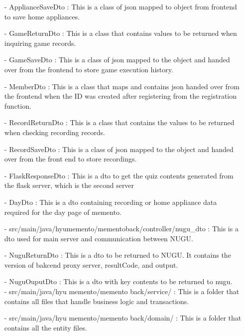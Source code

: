 \documentclass[conference]{IEEEtran}
\begin{document}
\begin{enumerate}
        \item[-] ApplianceSaveDto : This is a class of json mapped to object from frontend to save home appliances.\\
        \item [-] GameReturnDto : This is a class that contains values to be returned when inquiring game records.\\
        \item [-] GameSaveDto : This is a class of json mapped to the object and handed over from the frontend to store game execution history.\\
        \item [-] MemberDto : This is a class that maps and contains json handed over from the frontend when the ID was created after registering from the registration function.\\
        \item [-] RecordReturnDto : This is a class that contains the values to be returned when checking recording records.\\
        \item [-] RecordSaveDto : This is a class of json mapped to the object and handed over from the front end to store recordings.\\
        \item [-] FlaskResponseDto : This is a dto to get the quiz contents generated from the flask server, which is the second server\\
        \item [-] DayDto : This is a dto containing recording or home appliance data required for the day page of memento.\\
        \item [-] src/main/java/hyumemento/mementoback/controller/nugu\_dto : This is a dto used for main server and communication between NUGU.
        \item [-] NuguReturnDto : This is a dto to be returned to NUGU. It contains the version of bakcend proxy server, resultCode, and output.\\
        \item [-] NuguOuputDto : This is a dto with key contents to be returned to nugu.\\
        - src/main/java/hyu memento/memento back/service/ : This is a folder that contains all files that handle business logic and transactions.\\
        \item [-] src/main/java/hyu memento/memento back/domain/ : This is a folder that contains all the entity files.\\

\end{enumerate}
\end{document}

